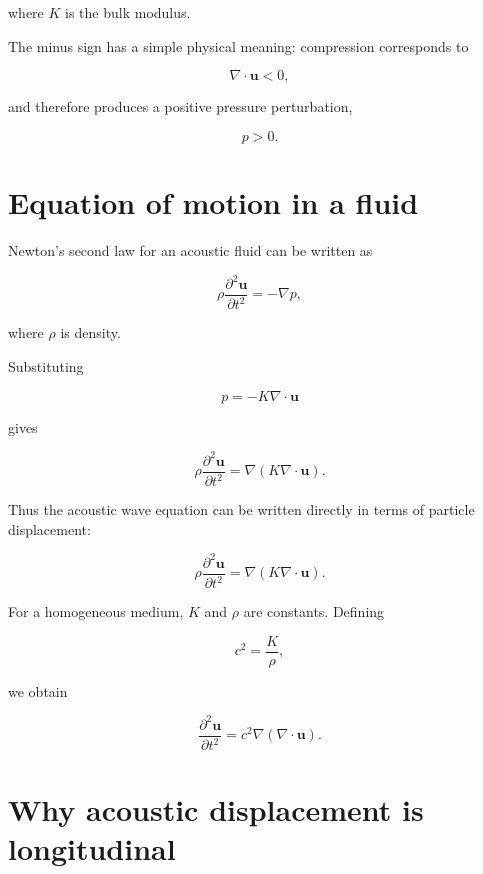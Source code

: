 \documentclass[11pt]{article}
\begin{document}
where $K$ is the bulk modulus.

The minus sign has a simple physical meaning: compression corresponds to

\[
\nabla\cdot\bm{u}<0,
\]

and therefore produces a positive pressure perturbation,

\[
p>0.
\]

\section{Equation of motion in a fluid}

Newton's second law for an acoustic fluid can be written as

\begin{equation}
    \boxed{
    \rho
    \frac{\partial^2\bm{u}}{\partial t^2}
    =
    -\nabla p,
    }
\end{equation}

where $\rho$ is density.

Substituting

\begin{equation}
    p=-K\nabla\cdot\bm{u}
\end{equation}

gives

\begin{equation}
    \rho
    \frac{\partial^2\bm{u}}{\partial t^2}
    =
    \nabla\left(K\nabla\cdot\bm{u}\right).
\end{equation}

Thus the acoustic wave equation can be written directly in terms of particle displacement:

\begin{equation}
    \boxed{
    \rho
    \frac{\partial^2\bm{u}}{\partial t^2}
    =
    \nabla\left(K\nabla\cdot\bm{u}\right).
    }
\end{equation}

For a homogeneous medium, $K$ and $\rho$ are constants. Defining

\begin{equation}
    c^2=\frac{K}{\rho},
\end{equation}

we obtain

\begin{equation}
    \frac{\partial^2\bm{u}}{\partial t^2}
    =
    c^2
    \nabla\left(\nabla\cdot\bm{u}\right).
\end{equation}

\section{Why acoustic displacement is longitudinal}
\end{document}
